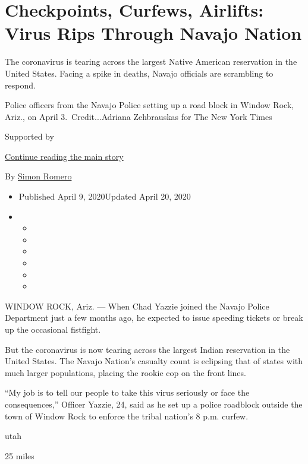 \hypertarget{checkpoints-curfews-airlifts-virus-rips-through-navajo-nation}{%
\section{Checkpoints, Curfews, Airlifts: Virus Rips Through Navajo
Nation}\label{checkpoints-curfews-airlifts-virus-rips-through-navajo-nation}}

The coronavirus is tearing across the largest Native American
reservation in the United States. Facing a spike in deaths, Navajo
officials are scrambling to respond.

Police officers from the Navajo Police setting up a road block in Window
Rock, Ariz., on April 3.~Credit...Adriana Zehbrauskas for The New York
Times

Supported by

\protect\hyperlink{after-sponsor}{Continue reading the main story}

By \href{https://www.nytimes3xbfgragh.onion/by/simon-romero}{Simon
Romero}

\begin{itemize}
\item
  Published April 9, 2020Updated April 20, 2020
\item
  \begin{itemize}
  \item
  \item
  \item
  \item
  \item
  \item
  \end{itemize}
\end{itemize}

WINDOW ROCK, Ariz. --- When Chad Yazzie joined the Navajo Police
Department just a few months ago, he expected to issue speeding tickets
or break up the occasional fistfight.

But the coronavirus is now tearing across the largest Indian reservation
in the United States. The Navajo Nation's casualty count is eclipsing
that of states with much larger populations, placing the rookie cop on
the front lines.

``My job is to tell our people to take this virus seriously or face the
consequences,'' Officer Yazzie, 24, said as he set up a police roadblock
outside the town of Window Rock to enforce the tribal nation's 8 p.m.
curfew.

utah

25 miles

